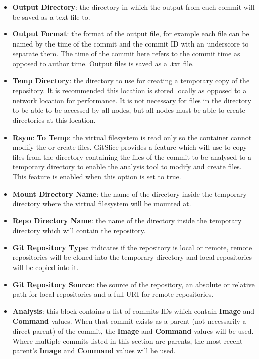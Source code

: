 \begin{itemize}
    \item \textbf{Output Directory}: the directory in which the output from each commit will be saved as a text file to.
    \item \textbf{Output Format}: the format of the output file, for example each file can be named by the time of the commit and the commit ID with an underscore to separate them.
          The time of the commit here refers to the commit time as opposed to author time.
          Output files is saved as a .txt file.
    \item \textbf{Temp Directory}: the directory to use for creating a temporary copy of the repository.
          It is recommended this location is stored locally as opposed to a network location for performance.
          It is not necessary for files in the directory to be able to be accessed by all nodes, but all nodes must be able to create directories at this location.
    \item \textbf{Rsync To Temp}: the virtual filesystem is read only so the container cannot modify the or create files.
          GitSlice provides a feature which will use  to copy files from the directory containing the files of the commit to be analysed to a temporary directory to enable the analysis tool to modify and create files.
          This feature is enabled when this option is set to true.
    \item \textbf{Mount Directory Name}: the name of the directory inside the temporary directory where the virtual filesystem will be mounted at.
    \item \textbf{Repo Directory Name}: the name of the directory inside the temporary directory which will contain the repository.
    \item \textbf{Git Repository Type}: indicates if the repository is local or remote, remote repositories will be cloned into the temporary directory and local repositories will be copied into it.
    \item \textbf{Git Repository Source}: the source of the repository, an absolute or relative path for local repositories and a full URI for remote repositories.
    \item \textbf{Analysis}: this block contains a list of commits IDs which contain \textbf{Image} and \textbf{Command} values.
          When that commit exists as a parent (not necessarily a direct parent) of the commit, the \textbf{Image} and \textbf{Command} values will be used.
          Where multiple commits listed in this section are parents, the most recent parent's \textbf{Image} and \textbf{Command} values will he used.

\end{itemize}
